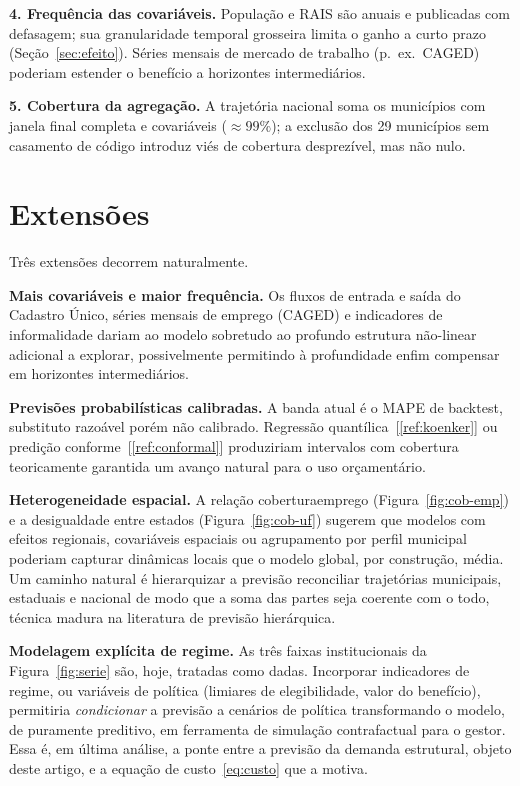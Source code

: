 \documentclass[12pt,a4paper,oneside]{article}
\newcommand{\C}[1]{[\ref{#1}]}
\begin{document}
\textbf{4. Frequência das covariáveis.} População e RAIS são anuais e
publicadas com defasagem; sua granularidade temporal grosseira limita o
ganho a curto prazo (Seção~\ref{sec:efeito}). Séries mensais de mercado de
trabalho (p.\ ex.\ CAGED) poderiam estender o benefício a horizontes
intermediários.

\textbf{5. Cobertura da agregação.} A trajetória nacional soma os
municípios com janela final completa e covariáveis ($\approx 99\%$); a
exclusão dos 29 municípios sem casamento de código introduz viés de
cobertura desprezível, mas não nulo.

\section{Extensões}
\label{sec:extensoes}

Três extensões decorrem naturalmente.

\textbf{Mais covariáveis e maior frequência.} Os fluxos de entrada e saída
do Cadastro Único, séries mensais de emprego (CAGED) e indicadores de
informalidade dariam ao modelo \textemdash{} sobretudo ao profundo
\textemdash{} estrutura não-linear adicional a explorar, possivelmente
permitindo à profundidade enfim compensar em horizontes intermediários.

\textbf{Previsões probabilísticas calibradas.} A banda atual é o MAPE de
backtest, substituto razoável porém não calibrado. Regressão
quantílica~\C{ref:koenker} ou predição conforme~\C{ref:conformal}
produziriam intervalos com cobertura teoricamente garantida \textemdash{}
um avanço natural para o uso orçamentário.

\textbf{Heterogeneidade espacial.} A relação cobertura\textendash emprego
(Figura~\ref{fig:cob-emp}) e a desigualdade entre estados
(Figura~\ref{fig:cob-uf}) sugerem que modelos com efeitos regionais,
covariáveis espaciais ou agrupamento por perfil municipal poderiam capturar
dinâmicas locais que o modelo global, por construção, média. Um caminho
natural é hierarquizar a previsão \textemdash{} reconciliar trajetórias
municipais, estaduais e nacional \textemdash{} de modo que a soma das
partes seja coerente com o todo, técnica madura na literatura de previsão
hierárquica.

\textbf{Modelagem explícita de regime.} As três faixas institucionais da
Figura~\ref{fig:serie} são, hoje, tratadas como dadas. Incorporar
indicadores de regime, ou variáveis de política (limiares de elegibilidade,
valor do benefício), permitiria \emph{condicionar} a previsão a cenários de
política \textemdash{} transformando o modelo, de puramente preditivo, em
ferramenta de simulação contrafactual para o gestor. Essa é, em última
análise, a ponte entre a previsão da demanda estrutural, objeto deste
artigo, e a equação de custo~\eqref{eq:custo} que a motiva.
\end{document}
